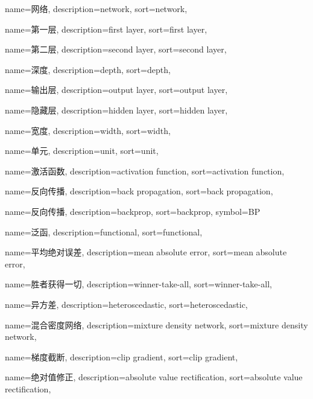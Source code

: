 {
  name=网络,
  description={network},
  sort={network},
}

{
  name=第一层,
  description={first layer},
  sort={first layer},
}

{
  name=第二层,
  description={second layer},
  sort={second layer},
}

{
  name=深度,
  description={depth},
  sort={depth},
}

{
  name=输出层,
  description={output layer},
  sort={output layer},
}

{
  name=隐藏层,
  description={hidden layer},
  sort={hidden layer},
}

{
  name=宽度,
  description={width},
  sort={width},
}

{
  name=单元,
  description={unit},
  sort={unit},
}

{
  name=激活函数,
  description={activation function},
  sort={activation function},
}

{
  name=反向传播,
  description={back propagation},
  sort={back propagation},
}

{
  name=反向传播,
  description={backprop},
  sort={backprop},
  symbol={BP}
}

{
  name=泛函,
  description={functional},
  sort={functional},
}

{
  name=平均绝对误差,
  description={mean absolute error},
  sort={mean absolute error},
}

{
  name=胜者获得一切,
  description={winner-take-all},
  sort={winner-take-all},
}

{
  name=异方差,
  description={heteroscedastic},
  sort={heteroscedastic},
}

{
  name=混合密度网络,
  description={mixture density network},
  sort={mixture density network},
}

{
  name=梯度截断,
  description={clip gradient},
  sort={clip gradient},
}

{
  name=绝对值修正,
  description={absolute value rectification},
  sort={absolute value rectification},
}

